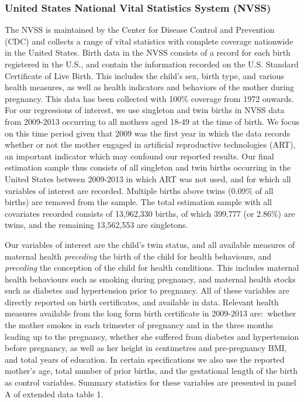 \documentclass{nature}
\begin{document}
\begin{linenumbers}
\subsubsection{United States National Vital Statistics System (NVSS)}
The NVSS is maintained by the Center for Disease Control and Prevention (CDC) and collects a range of vital statistics with complete coverage nationwide in the United States. Birth data in the NVSS consists of a record for each birth registered in the U.S., and contain the information recorded on the U.S. Standard Certificate of Live Birth.  This includes the child's sex, birth type, and various health measures, as well as health indicators and behaviors of the mother during pregnancy.  This data has been collected with 100\% coverage from 1972 onwards.  For our regressions of interest, we use singleton and twin births in NVSS data from 2009-2013\cite{Martinetal2013} occurring to all mothers aged 18-49 at the time of birth.  We focus on this time period given that 2009 was the first year in which the data records whether or not the mother engaged in artificial reproductive technologies (ART), an important indicator which may confound our reported results.  Our final estimation sample thus consists of all singleton and twin births occurring in the United States between 2009-2013 in which ART was not used, and for which all variables of interest are recorded.  Multiple births above twins (0.09\% of all births) are removed from the sample.  The total estimation sample with all covariates recorded consists of 13,962,330 births, of which 399,777 (or 2.86\%) are twins, and the remaining 13,562,553 are singletons.

Our variables of interest are the child's twin status, and all available measures of maternal health \emph{preceding} the birth of the child for health behaviours, and \emph{preceding} the conception of the child for health conditions.  This includes maternal health behaviours such as smoking during pregnancy, and maternal health stocks such as diabetes and hypertension prior to pregnancy.  All of these variables are directly reported on birth certificates, and available in data.  Relevant health measures available from the long form birth certificate in 2009-2013 are:\ whether the mother smokes in each trimester of pregnancy and in the three months leading up to the pregnancy, whether she suffered from diabetes and hypertension before pregnancy, as well as her height in centimetres and pre-pregnancy BMI, and total years of education.  In certain specifications we also use the reported mother's age, total number of prior births, and the gestational length of the birth as control variables\cite{Hall2003}.  Summary statistics for these variables are presented in panel A of extended data table 1.


\end{linenumbers}
\end{document}
